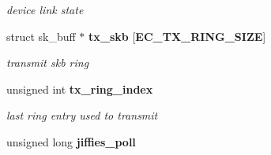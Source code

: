 \begin{DoxyCompactItemize}
\begin{DoxyCompactList}\small\item\em device link state \end{DoxyCompactList}\item 
struct sk\-\_\-buff $\ast$ {\bf tx\-\_\-skb} [{\bf \-E\-C\-\_\-\-T\-X\-\_\-\-R\-I\-N\-G\-\_\-\-S\-I\-Z\-E}]\label{structec__device_a733aeb60035ac3696f05dc33adf49004}

\begin{DoxyCompactList}\small\item\em transmit skb ring \end{DoxyCompactList}\item 
unsigned int {\bf tx\-\_\-ring\-\_\-index}\label{structec__device_af9353b63b910b0b64d06837b3f7075b7}

\begin{DoxyCompactList}\small\item\em last ring entry used to transmit \end{DoxyCompactList}\item 
unsigned long {\bf jiffies\-\_\-poll}\label{structec__device_af98c616a488455db59c5c4297206b8fb}


\end{DoxyCompactItemize}
